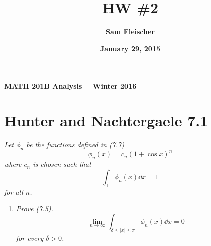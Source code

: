 \documentclass[12pt]{article}
\title{\bf HW \#2}
\author{\bf Sam Fleischer}
\date{\bf January 29, 2015}
\theoremstyle{plain}
\begin{document}
\textbf{MATH 201B \hfill Analysis \ \ \hfill Winter 2016\ \ \ }

{\let\newpage\relax\maketitle}

\section*{Hunter and Nachtergaele 7.1}
\emph{Let $\phi_n$ be the functions defined in (7.7) $$\phi_n(x) = c_n(1 + \cos x)^n$$ where $c_n$ is chosen such that $$\int_\mathbb{T}\phi_n(x) \dd x = 1$$ for all $n$.}
\begin{enumerate}[\bf (a)]
    \item
        \emph{Prove (7.5).  $$\lim_{n\rightarrow \infty}\int_{\delta\leq|x|\leq \pi}\phi_n(x) \dd x = 0$$ for every $\delta > 0$.} \\


\end{enumerate}
\end{document}
